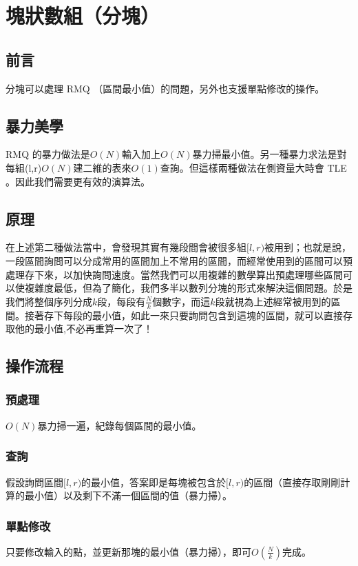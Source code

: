 \chapter{塊狀數組（分塊）}
\section{前言}
分塊可以處理 RMQ （區間最小值）的問題，另外也支援單點修改的操作。
\section{暴力美學}
RMQ 的暴力做法是$O(N)$輸入加上$O(N)$暴力掃最小值。另一種暴力求法是對每組(l,r)$O(N)$建二維的表來$O(1)$查詢。但這樣兩種做法在側資量大時會 TLE 。因此我們需要更有效的演算法。
\section{原理}
在上述第二種做法當中，會發現其實有幾段間會被很多組$[l,r)$被用到；也就是說，一段區間詢問可以分成常用的區間加上不常用的區間，而經常使用到的區間可以預處理存下來，以加快詢問速度。當然我們可以用複雜的數學算出預處理哪些區間可以使複雜度最低，但為了簡化，我們多半以數列分塊的形式來解決這個問題。於是我們將整個序列分成$k$段，每段有$\frac{N}{k}$個數字，而這$k$段就視為上述經常被用到的區間。接著存下每段的最小值，如此一來只要詢問包含到這塊的區間，就可以直接存取他的最小值,不必再重算一次了！
\section{操作流程}
\subsection{預處理}
$O(N)$暴力掃一遍，紀錄每個區間的最小值。
\subsection{查詢}
假設詢問區間$[l,r)$的最小值，答案即是每塊被包含於$[l,r)$的區間（直接存取剛剛計算的最小值）以及剩下不滿一個區間的值（暴力掃）。
\subsection{單點修改}
只要修改輸入的點，並更新那塊的最小值（暴力掃），即可$O(\frac{N}{k})$完成。

